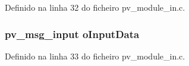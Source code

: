 Definido na linha 32 do ficheiro pv\-\_\-module\-\_\-in.\-c.

\hypertarget{group__Module__IO_gaffc6f7805bab2d46af160c6f7715ba99}{
\subsubsection[{o\-Input\-Data}]{\setlength{\rightskip}{0pt plus 5cm}pv\-\_\-msg\-\_\-input o\-Input\-Data}}\label{group__Module__IO_gaffc6f7805bab2d46af160c6f7715ba99}


Definido na linha 33 do ficheiro pv\-\_\-module\-\_\-in.\-c.

